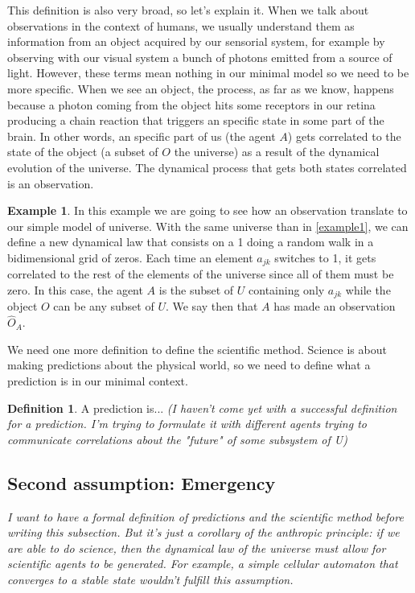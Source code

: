 \documentclass[11pt,a4paper,twoside]{report}
\newcommand{\+}{\textnormal{+} }
\theoremstyle{definition}
\newtheorem{mydef}[mythm]{Definition}
\newtheorem{myex}[mythm]{Example}
\numberwithin{equation}{chapter}
\begin{document}
This definition is also very broad, so let's explain it. When we talk about
observations in the context of humans, we usually understand them as information
from an object acquired by our sensorial system, for example by observing with
our visual system a bunch of photons emitted from a source of light. However,
these terms mean nothing in our minimal model so we need to be more specific.
When we see an object, the process, as far as we know, happens because a photon
coming from the object hits some receptors in our retina producing a chain
reaction that triggers an specific state in some part of the brain. In other
words, an specific part of us (the agent $A$) gets correlated to the state of
the object (a subset of $O$ the universe) as a result of the dynamical evolution
of the universe. The dynamical process that gets both states correlated is an
observation.

\begin{myex}
  In this example we are going to see how an observation translate to our simple
  model of universe. With the same universe than in \ref{example1}, we can
  define a new dynamical law that consists on a 1 doing a random walk in a
  bidimensional grid of zeros. Each time an element $a_{jk}$ switches to 1, it
  gets correlated to the rest of the elements of the universe since all of them
  must be zero. In this case, the agent $A$ is the subset of $U$ containing only
  $a_{jk}$ while the object $O$ can be any subset of $U$. We say then that $A$
  has made an observation $\hat{O}_{A}$.
\end{myex}

We need one more definition to define the scientific method. Science is about
making predictions about the physical world, so we need to define what a
prediction is in our minimal context.



\begin{mydef}
  A prediction is... \textit{(I haven't come yet with a successful definition
  for a prediction. I'm trying to formulate it with different agents trying
  to communicate correlations about the "future" of some subsystem of U)}
\end{mydef}

\subsection{Second assumption: Emergency}
\textit{I want to have a formal definition of predictions and the scientific
method before writing this subsection. But it's just a corollary of the
anthropic principle: if we are able to do science, then the dynamical law of the
universe must allow for scientific agents to be generated. For example, a simple
cellular automaton that converges to a stable state wouldn't fulfill this
assumption.}
\end{document}
